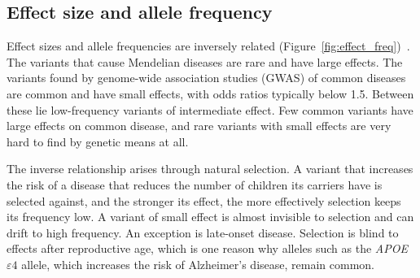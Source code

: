 \subsection{Effect size and allele frequency}

Effect sizes and allele frequencies are inversely related (Figure~\ref{fig:effect_freq})~\citep{manolio2009}. The variants that cause Mendelian diseases are rare and have large effects. The variants found by genome-wide association studies (GWAS) of common diseases are common and have small effects, with odds ratios typically below 1.5. Between these lie low-frequency variants of intermediate effect. Few common variants have large effects on common disease, and rare variants with small effects are very hard to find by genetic means at all.

The inverse relationship arises through natural selection. A variant that increases the risk of a disease that reduces the number of children its carriers have is selected against, and the stronger its effect, the more effectively selection keeps its frequency low. A variant of small effect is almost invisible to selection and can drift to high frequency. An exception is late-onset disease. Selection is blind to effects after reproductive age, which is one reason why alleles such as the \textit{APOE} $\varepsilon4$ allele, which increases the risk of Alzheimer's disease, remain common.

